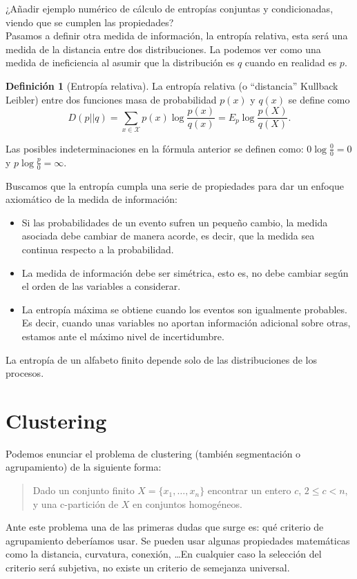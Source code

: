\documentclass[10pt,a4paper]{article} %
\theoremstyle{definition}
\newtheorem{definition}{Definición}[section]
\begin{document}
¿Añadir ejemplo numérico de cálculo de entropías conjuntas y condicionadas, viendo que se cumplen las propiedades?\\

Pasamos a definir otra medida de información, la entropía relativa, esta será una medida de la distancia entre dos distribuciones. La podemos ver como una medida de ineficiencia al asumir que la distribución es $q$ cuando en realidad es $p$.

\begin{definition}[Entropía relativa]
  La entropía relativa (o ``distancia'' Kullback Leibler) entre dos funciones masa de probabilidad $p(x)$ y $q(x)$ se define como\[
D(p||q) = \sum_{x \in \mathcal{X}}p(x) \log \frac{p(x)}{q(x)} = E_p \log \frac{p(X)}{q(X)}.
  \]
\end{definition}
Las posibles indeterminaciones en la fórmula anterior se definen como: $0 \log \frac{0}{0} = 0$ y $p \log \frac{p}{0} = \infty$.


Buscamos que la entropía cumpla una serie de propiedades para dar un enfoque axiomático de la medida de información:

    \begin{itemize}
    \item Si las probabilidades de un evento sufren un pequeño cambio, la medida asociada debe cambiar de manera acorde, es decir, que la medida sea continua respecto a la probabilidad.
    \item La medida de información debe ser simétrica, esto es, no debe cambiar según el orden de las variables a considerar.
    \item La entropía máxima se obtiene cuando los eventos son igualmente probables. Es decir, cuando unas variables no aportan información adicional sobre otras, estamos ante el máximo nivel de incertidumbre.
    \end{itemize}

    La entropía de un alfabeto finito depende solo de las distribuciones de los procesos.

    
    \section{Clustering}
    Podemos enunciar el problema de clustering (también segmentación o agrupamiento) de la siguiente forma:
    \begin{quote}
      Dado un conjunto finito $X=\{x_1,\dots,x_n\}$ encontrar un entero $c$, $2 \leq c < n$, y una c-partición de $X$ en conjuntos homogéneos.
    \end{quote}
    Ante este problema una de las primeras dudas que surge es: qué criterio de agrupamiento deberíamos usar. Se pueden usar algunas propiedades matemáticas como la distancia, curvatura, conexión, \dots  En cualquier caso la selección del criterio será subjetiva, no existe un criterio de semejanza universal.
    
\end{document}
